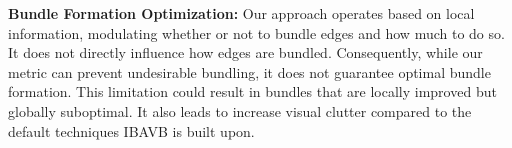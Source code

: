 \textbf{Bundle Formation Optimization:} Our approach operates based on local information, modulating whether or not to bundle edges and how much to do so. It does not directly influence how edges are bundled. Consequently, while our metric can prevent undesirable bundling, it does not guarantee optimal bundle formation. This limitation could result in bundles that are locally improved but globally suboptimal. It also leads to increase visual clutter compared to the default techniques IBAVB is built upon.
